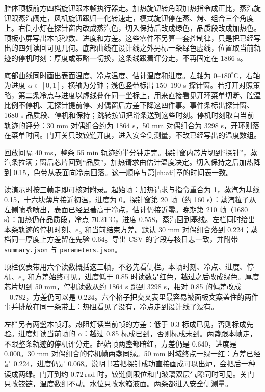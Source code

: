 腔体顶板前方四档旋钮跟本帧执行器走。加热旋钮转角跟加热指令成正比，蒸汽旋钮跟蒸汽阀走，风机旋钮跟归一化转速走，模式旋钮停在蒸、烤、组合三个角度上。右侧小灯在探针窗内改成蒸汽色，切入保持后改成绿色，品质段改成加热色。顶板小屏写出本帧秒数、进度和方差。这些零件不另算一套控制律，只是把已经写出的四列读回可见几何。底部曲线在设计线之外另标一条绿色虚线，位置取当前轨迹的停机时刻：厚度或策略一切换，这条线跟着评分走，不再固定在 1866 s。

底部曲线同时画出表面温度、冷点温度、估计温度和进度。左轴为 \(0\)--\(180^\circ\mathrm{C}\)，右轴为进度 \(\alpha\in[0,1]\)，横轴为分钟；浅色竖带标出 150--190 s 探针窗。若打开对照策略，第二条冷点与进度以虚线叠在同一坐标上，用来直接看见开环菜单切断、腔温比例不停机、无探针提前停、对偶窗后方差下降这四件事。事件条标出探针窗、1680 s 品质段、停机和保持；跳转按钮把滑条送到这些时刻。停机时刻取自当前轨迹的评分：30 mm 对偶组合约为 1864 s，50 mm 对偶组合为 3298 s，开环则落在菜单时间。门开关只改铰链开度，进入安全侧测量，不改已经写出的温度数组。

回放间隔 40 ms，整条 55 min 轨迹约半分钟走完。探针窗内芯片切到“探针”，蒸汽条拉满；窗后芯片回到“品质”，加热请求由估计温度决定。切入保持之后加热降到 0.15，色带从表面向冷点回落。这一顺序与第\ref{ch:ati}章的时间表一致。

读演示时按三帧走即可核对附录。起始帧：加热请求与指令重合为 1，蒸汽为基线 0.15，十六块薄片接近初温，进度为 0。探针窗第 20 帧（约 160 s）：蒸汽粒子从左侧喷嘴喷出，表面已经显著高于冷点，估计仍接近零。晚期第 210 帧（1680 s）：加热仍在品质段，冷点 \(70.21^\circ\mathrm{C}\)，进度 0.558，蒸汽回到基线。左栏同时给出本条轨迹的停机时刻、\(e_{\alpha}\) 和当前结束方差。默认 30 mm 对偶组合落到 0.224；蒸档同一厚度上方差留在先验 0.64。导出 CSV 的字段与核日志一致，并附带 \texttt{summary.json} 与 \texttt{parameters.json}。

顶栏仪表带用六个读数概括这三帧，不必先看侧栏。本帧时刻、冷点、进度、停机、\(e_{\alpha}\) 和方差始终可见。进度低于 0.85 时读数是红色，越过之后改成绿色。厚度芯片切到 50 mm，停机读数从约 1864 s 跳到 3298 s，相对 0.85 的偏差改成 \(-0.782\)，方差仍可以是 0.224。六个格子把交叉表里最容易被面板文案盖住的两件事并排放在同一条带上：热阻看见了没有，冷点走到设计线了没有。

左栏另有两盏本帧灯。热阻灯读当前帧的方差：低于 0.3 标成已见，否则标成先验。进度灯读当前帧的 \(\alpha\)：越过 0.85 标成已到，否则标成未到。两盏跟本帧走，不跟整条轨迹的停机评分走。起始帧两盏都暗红，方差仍是 0.640，进度是 0.000。30 mm 对偶组合的停机帧两盏同绿。50 mm 时域终点一绿一红：方差已经是 0.224，进度仍是 0.068。说明书若把探针成功直接画成可以出炉，会把后一种读成两绿。门开到约 \(0.72\,\mathrm{rad}\) 时，铰链侧限位和门玻璃双层气隙同时可见。关门只改铰链，温度数组不动。水位只改水箱液面。两条都进入安全侧测量。

